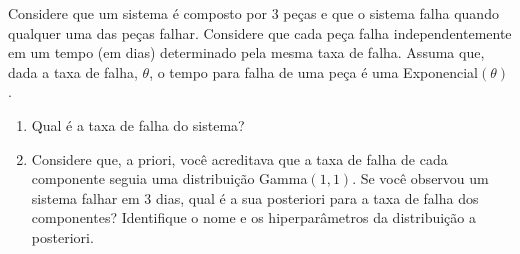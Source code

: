 \begin{exercise}
 Considere que um sistema é composto por $3$ peças e 
 que o sistema falha quando qualquer uma 
 das peças falhar.
 Considere que cada peça falha independentemente
 em um tempo (em dias) determinado pela 
 mesma taxa de falha.
 Assuma que, dada a taxa de falha, $\theta$,
 o tempo para falha de uma peça é uma
 Exponencial$(\theta)$.
 \begin{enumerate}[label=(\alph*)]
  \item Qual é a taxa de falha do sistema?
  \item Considere que, a priori, 
  você acreditava que a taxa de falha de 
  cada componente seguia uma distribuição Gamma$(1,1)$.
  Se você observou um sistema falhar em $3$ dias,
  qual é a sua posteriori para a taxa de falha dos
  componentes?
  Identifique o nome e os hiperparâmetros da
  distribuição a posteriori.
 \end{enumerate}
\end{exercise}


